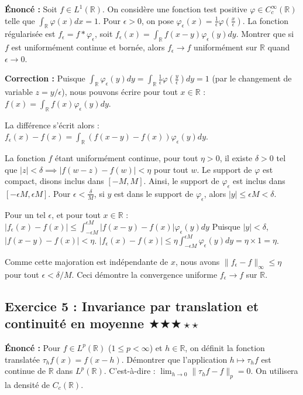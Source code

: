 \documentclass[11pt,a4paper]{article}
\begin{document}
\textbf{Énoncé :}
Soit $f \in L^1(\mathbb{R})$. On considère une fonction test positive $\varphi \in C_c^\infty(\mathbb{R})$ telle que $\int_{\mathbb{R}} \varphi(x) dx = 1$.
Pour $\epsilon > 0$, on pose $\varphi_\epsilon(x) = \frac{1}{\epsilon}\varphi(\frac{x}{\epsilon})$.
La fonction régularisée est $f_\epsilon = f * \varphi_\epsilon$, soit $f_\epsilon(x) = \int_{\mathbb{R}} f(x-y)\varphi_\epsilon(y) dy$.
Montrer que si $f$ est uniformément continue et bornée, alors $f_\epsilon \to f$ uniformément sur $\mathbb{R}$ quand $\epsilon \to 0$.

\textbf{Correction :}
Puisque $\int_{\mathbb{R}} \varphi_\epsilon(y) dy = \int_{\mathbb{R}} \frac{1}{\epsilon}\varphi(\frac{y}{\epsilon}) dy = 1$ (par le changement de variable $z = y/\epsilon$), nous pouvons écrire pour tout $x \in \mathbb{R}$ :
$f(x) = \int_{\mathbb{R}} f(x) \varphi_\epsilon(y) dy$.

La différence s'écrit alors :
$f_\epsilon(x) - f(x) = \int_{\mathbb{R}} (f(x-y) - f(x)) \varphi_\epsilon(y) dy$.

La fonction $f$ étant uniformément continue, pour tout $\eta > 0$, il existe $\delta > 0$ tel que $|z| < \delta \implies |f(w-z) - f(w)| < \eta$ pour tout $w$.
Le support de $\varphi$ est compact, disons inclus dans $[-M, M]$.
Ainsi, le support de $\varphi_\epsilon$ est inclus dans $[-\epsilon M, \epsilon M]$.
Pour $\epsilon < \frac{\delta}{M}$, si $y$ est dans le support de $\varphi_\epsilon$, alors $|y| \le \epsilon M < \delta$.

Pour un tel $\epsilon$, et pour tout $x \in \mathbb{R}$ :
$|f_\epsilon(x) - f(x)| \le \int_{-\epsilon M}^{\epsilon M} |f(x-y) - f(x)| \varphi_\epsilon(y) dy$
Puisque $|y| < \delta$, $|f(x-y) - f(x)| < \eta$.
$|f_\epsilon(x) - f(x)| \le \eta \int_{-\epsilon M}^{\epsilon M} \varphi_\epsilon(y) dy = \eta \times 1 = \eta$.

Comme cette majoration est indépendante de $x$, nous avons $\| f_\epsilon - f \|_\infty \le \eta$ pour tout $\epsilon < \delta/M$.
Ceci démontre la convergence uniforme $f_\epsilon \to f$ sur $\mathbb{R}$.


\subsection*{Exercice 5 : Invariance par translation et continuité en moyenne \quad $\bigstar\bigstar\bigstar\star\star$}

\textbf{Énoncé :}
Pour $f \in L^p(\mathbb{R})$ ($1 \le p < \infty$) et $h \in \mathbb{R}$, on définit la fonction translatée $\tau_h f(x) = f(x - h)$.
Démontrer que l'application $h \mapsto \tau_h f$ est continue de $\mathbb{R}$ dans $L^p(\mathbb{R})$.
C'est-à-dire : $\lim_{h \to 0} \| \tau_h f - f \|_p = 0$. On utilisera la densité de $C_c(\mathbb{R})$.
\end{document}
